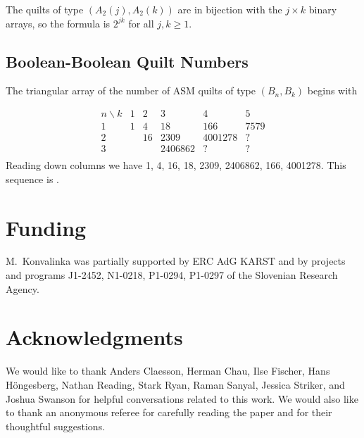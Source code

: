 \documentclass[12pt]{amsart}
\numberwithin{equation}{section}
\theoremstyle{definition}
\begin{document}
The quilts of type $(A_2(j), A_2(k))$ are in bijection with the
$j\times k$ binary arrays, so the formula is $2^{jk}$ for all $j,k\geq
1$. 


\subsection{Boolean-Boolean Quilt Numbers}

The triangular array of the number of ASM quilts of type $(B_n,
B_{k})$ begins with

$$\begin{array}{c|ccccc}
   n \backslash k & 1 & 2 & 3  & 4   & 5 \\ \hline
                1 & 1 & 4 & 18 & 166 & 7579 \\
2& {} & 16 & 2309 & 4001278  & {?}\\
3& {} & {} & 2406862  & {?} & {?}\\
\end{array}
$$
Reading down columns we have 1, 4, 16, 18, 2309, 2406862, 166,
4001278. This sequence is \cite[A374824]{oeis}.

\section*{Funding}

M.~Konvalinka was partially supported by ERC AdG KARST and by projects and programs J1-2452, N1-0218, P1-0294, P1-0297 of the Slovenian Research Agency.



\section*{Acknowledgments}

We would like to thank Anders Claesson, Herman Chau, Ilse Fischer, Hans
H\"ongesberg, Nathan Reading, Stark Ryan, Raman Sanyal, Jessica Striker, and Joshua
Swanson for helpful conversations related to this
work.  We would also like to thank an anonymous referee for carefully reading the paper and for their thoughtful suggestions.
\end{document}
